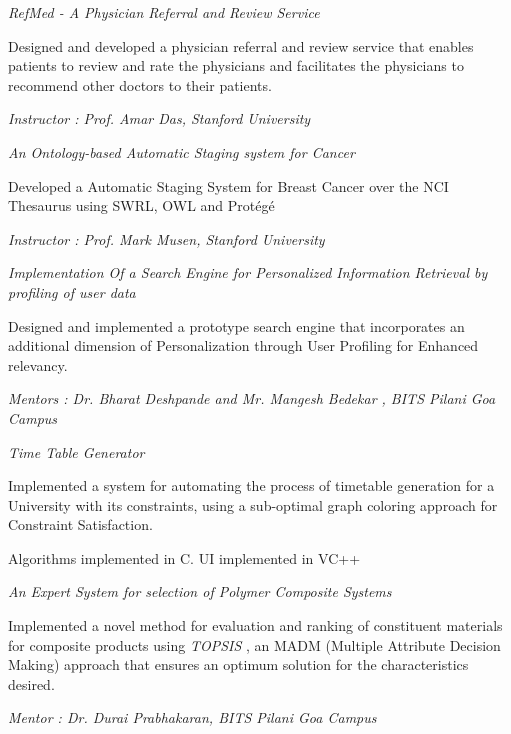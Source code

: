 \documentclass[10pt]{article}
\newcommand{\spc}{\vspace{1.2mm}}
\begin{document}
\textit{RefMed - A Physician Referral and Review Service}
\begin{compactitem}
\item {Designed and developed a physician referral and review service that enables patients to review and rate the physicians and facilitates the physicians to recommend other doctors to their patients.}
\item \emph{Instructor :  Prof. Amar Das, Stanford University}
\end{compactitem}
\spc
\textit{An Ontology-based Automatic Staging system for Cancer}
\begin{compactitem}
\item {Developed a Automatic Staging System for Breast Cancer over the NCI Thesaurus using SWRL, OWL and Prot\'{e}g\'{e}}
\item \emph{Instructor :  Prof. Mark Musen, Stanford University}
\end{compactitem}
\spc
\textit{Implementation Of a Search Engine for Personalized Information Retrieval by profiling of user data}
\begin{compactitem}
\item Designed and implemented  a prototype search engine that incorporates an additional dimension of Personalization through User Profiling for Enhanced relevancy.
\item \emph{Mentors : Dr. Bharat Deshpande and Mr. Mangesh Bedekar , BITS Pilani Goa Campus}
\end{compactitem}
\spc
\textit{Time Table Generator}
\begin{compactitem}
\item Implemented a system for automating the process of timetable generation for a University with its constraints, using a sub-optimal graph coloring approach for Constraint Satisfaction.
\item{Algorithms implemented in C. UI implemented in VC++}
\end{compactitem}
\spc
\textit{An Expert System for selection of Polymer Composite Systems }
\begin{compactitem}
\item Implemented a novel method for evaluation and ranking of constituent materials for composite products using \emph{TOPSIS} , an MADM (Multiple Attribute Decision Making) approach that ensures an optimum solution for the characteristics desired.
\item \emph{Mentor : Dr. Durai Prabhakaran, BITS Pilani Goa Campus}
\end{compactitem}
\end{document}
